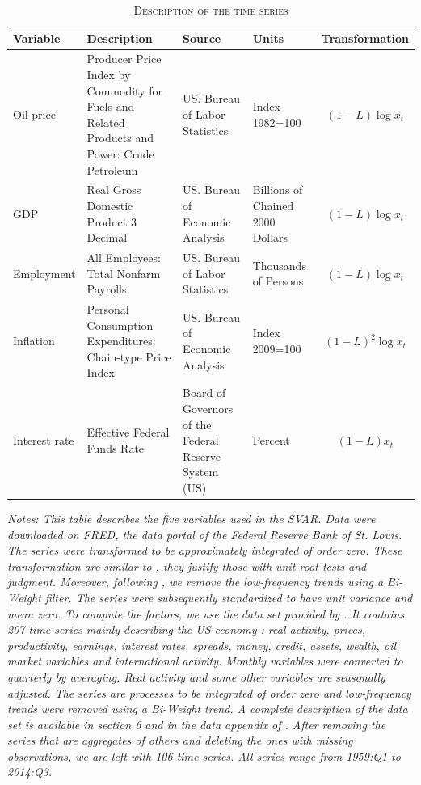 \documentclass[11pt,a4paper]{article}
\begin{document}
\begin{table}[H]
	\begin{center}
		\caption{\textsc{Description of the time  series}}
		\label{tab:data}
		\begin{tabularx}{1.05\textwidth}{lXXXc}
			\toprule \toprule
			\textbf{Variable} & \textbf{Description} & \textbf{Source} & \textbf{Units} & \textbf{Transformation}  \\ 
			\midrule
			Oil price	& Producer Price Index  by Commodity for Fuels and Related Products and Power: Crude Petroleum & US. Bureau of Labor Statistics & Index 1982=100 & $(1-L)\log x_t$  \\ 
			GDP	& Real Gross Domestic Product 3 Decimal & US. Bureau of Economic Analysis & Billions of Chained 2000 Dollars & $(1-L)\log x_t$ \\ 
			Employment	& All Employees: Total Nonfarm Payrolls & US. Bureau of Labor Statistics & Thousands of Persons & $(1-L)\log x_t$ \\ 
			Inflation	& Personal Consumption Expenditures: Chain-type Price Index &  US. Bureau of Economic Analysis & Index 2009=100 & $(1-L)^2 \log x_t$ \\
			Interest rate	& Effective Federal Funds Rate & Board of Governors of the Federal Reserve System (US) & Percent & $(1-L) x_t$  \\
			\bottomrule \bottomrule
		\end{tabularx} 
	\end{center}
	\footnotesize{\emph{Notes: 
			This table describes the five variables used in the SVAR. 
			Data were downloaded on FRED, the data portal of the Federal Reserve Bank of St. Louis.  
			The series were transformed  to be approximately integrated of order zero. 
			These transformation are similar to \cite{stock2015factor}, they justify those with unit root tests and judgment. 
			Moreover, following \cite{stock2015factor}, we remove the low-frequency trends using a Bi-Weight filter.  
			The series were subsequently standardized to have unit variance and mean zero.
			To compute the factors, we use the data set provided by \cite{stock2015factor}. 
			It contains 207 time series  mainly describing the US economy : real activity, prices, productivity, earnings, interest rates, spreads, money, credit, assets, wealth, oil market variables and  international activity.  
			Monthly variables were converted to quarterly by  averaging. 
			Real activity and some other variables are seasonally adjusted. 
			The series are processes to be integrated of order zero and low-frequency trends were removed using a Bi-Weight trend. 
			A complete description of the data set is available in section 6 and in the data appendix of \cite{stock2015factor}.
			After removing the series that are aggregates of others and deleting the ones with missing observations, we are left with 106 time series. 
			All series range from 1959:Q1 to 2014:Q3.} }
\end{table}
\end{document}

